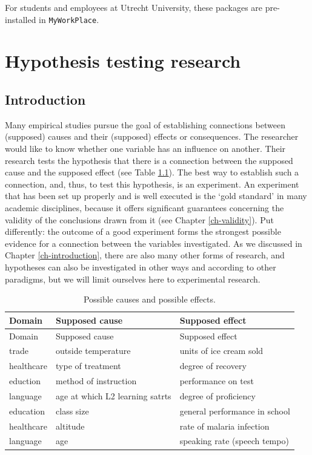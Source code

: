 \documentclass[
]{book}
\begin{document}
For students and employees at Utrecht University, these packages are pre-installed in \texttt{MyWorkPlace}.

\hypertarget{ch-research}{%
\chapter{Hypothesis testing research}\label{ch-research}}

\hypertarget{introduction}{%
\section{Introduction}\label{introduction}}

Many empirical studies pursue the goal of establishing connections between (supposed) causes and their (supposed) effects or consequences. The researcher would like to know whether one variable has an influence on another. Their research tests the hypothesis that there is a connection between the supposed cause and the supposed effect (see Table \ref{tab:causeeffect}). The best way to establish such a connection, and, thus, to test this hypothesis, is an experiment. An experiment that has been set up properly and is well executed is the `gold standard' in many academic disciplines, because it offers significant guarantees concerning the validity of the conclusions drawn from it (see Chapter \ref{ch-validity}). Put differently: the outcome of a good experiment forms the strongest possible evidence for a connection between the variables investigated. As we discussed in Chapter \ref{ch-introduction}, there are also many other forms of research, and hypotheses can also be investigated in other ways and according to other paradigms, but we will limit ourselves here to experimental research.

\begin{longtable}[]{@{}lll@{}}
\caption{\label{tab:causeeffect} Possible causes and possible effects.}\tabularnewline
\toprule\noalign{}
Domain & Supposed cause & Supposed effect \\
\midrule\noalign{}
\endfirsthead
\toprule\noalign{}
Domain & Supposed cause & Supposed effect \\
\midrule\noalign{}
\endhead
\bottomrule\noalign{}
\endlastfoot
trade & outside temperature & units of ice cream sold \\
healthcare & type of treatment & degree of recovery \\
eduction & method of instruction & performance on test \\
language & age at which L2 learning satrts & degree of proficiency \\
education & class size & general performance in school \\
healthcare & altitude & rate of malaria infection \\
language & age & speaking rate (speech tempo) \\
\end{longtable}
\end{document}
